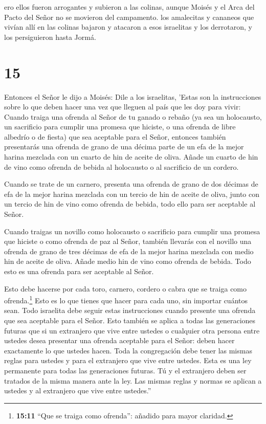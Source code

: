  ero ellos fueron arrogantes y subieron a las colinas,
aunque Moisés y el Arca del Pacto del Señor no se movieron del
campamento.  los amalecitas y cananeos que vivían allí en
las colinas bajaron y atacaron a esos israelitas y los derrotaron, y los
persiguieron hasta Jormá.

\hypertarget{section-14}{%
\section{15}\label{section-14}}

 Entonces el Señor le dijo a Moisés:  Dile a los
israelitas, 'Estas son la instrucciones sobre lo que deben hacer una vez
que lleguen al país que les doy para vivir:  Cuando traiga
una ofrenda al Señor de tu ganado o rebaño (ya sea un holocausto, un
sacrificio para cumplir una promesa que hiciste, o una ofrenda de libre
albedrío o de fiesta) que sea aceptable para el Señor, 
entonces también presentarás una ofrenda de grano de una décima parte de
un efa de la mejor harina mezclada con un cuarto de hin de aceite de
oliva.  Añade un cuarto de hin de vino como ofrenda de
bebida al holocausto o al sacrificio de un cordero.

 Cuando se trate de un carnero, presenta una ofrenda de
grano de dos décimas de efa de la mejor harina mezclada con un tercio de
hin de aceite de oliva,  junto con un tercio de hin de vino
como ofrenda de bebida, todo ello para ser aceptable al Señor.

 Cuando traigas un novillo como holocausto o sacrificio para
cumplir una promesa que hiciste o como ofrenda de paz al Señor,
 también llevarás con el novillo una ofrenda de grano de
tres décimas de efa de la mejor harina mezclada con medio hin de aceite
de oliva.  Añade medio hin de vino como ofrenda de bebida.
Todo esto es una ofrenda para ser aceptable al Señor.

 Esto debe hacerse por cada toro, carnero, cordero o cabra
que se traiga como ofrenda.\footnote{\textbf{15:11} ``Que se traiga como
  ofrenda'': añadido para mayor claridad.}  Esto es lo que
tienes que hacer para cada uno, sin importar cuántos sean. 
Todo israelita debe seguir estas instrucciones cuando presente una
ofrenda que sea aceptable para el Señor.  Esto también se
aplica a todas las generaciones futuras que si un extranjero que vive
entre ustedes o cualquier otra persona entre ustedes desea presentar una
ofrenda aceptable para el Señor: deben hacer exactamente lo que ustedes
hacen.  Toda la congregación debe tener las mismas reglas
para ustedes y para el extranjero que vive entre ustedes. Esta es una
ley permanente para todas las generaciones futuras. Tú y el extranjero
deben ser tratados de la misma manera ante la ley.  Las
mismas reglas y normas se aplican a ustedes y al extranjero que vive
entre ustedes.''

